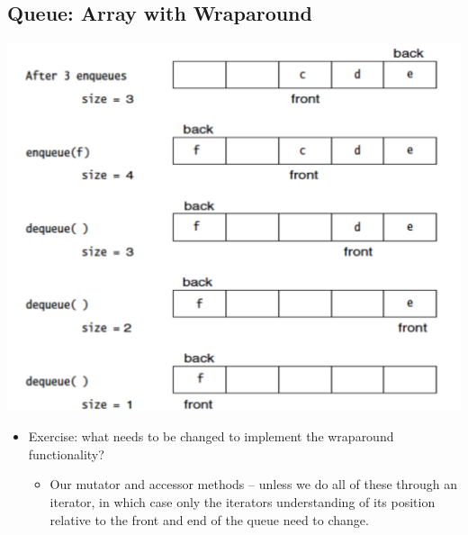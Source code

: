 \documentclass[10pt]{article}
\begin{document}
\subsection*{Queue: Array with Wraparound}
\begin{center}
\includegraphics[width=\textwidth/2]{images/7.png}
\end{center}
\begin{itemize}
    \item Exercise: what needs to be changed to implement the wraparound functionality?
    \begin{itemize}
        \item Our mutator and accessor methods -- unless we do all of these through an iterator, in which case only the iterators understanding of its position relative to the front and end of the queue need to change.
    \end{itemize}
\end{itemize}
\end{document}
